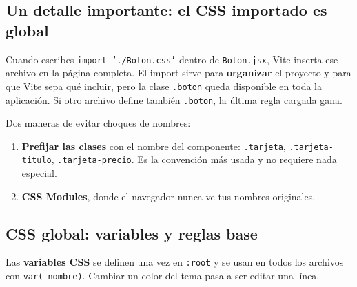 \documentclass[11pt,a4paper]{article}
\newcommand{\cmd}[1]{\texttt{\color{reactdark}#1}}
\begin{document}
\subsection{Un detalle importante: el CSS importado es global}

Cuando escribes \cmd{import './Boton.css'} dentro de \cmd{Boton.jsx}, Vite inserta ese archivo en la página completa. El import sirve para \textbf{organizar} el proyecto y para que Vite sepa qué incluir, pero la clase \cmd{.boton} queda disponible en toda la aplicación. Si otro archivo define también \cmd{.boton}, la última regla cargada gana.

Dos maneras de evitar choques de nombres:
\begin{enumerate}[leftmargin=*]
  \item \textbf{Prefijar las clases} con el nombre del componente: \cmd{.tarjeta}, \cmd{.tarjeta-titulo}, \cmd{.tarjeta-precio}. Es la convención más usada y no requiere nada especial.
  \item \textbf{CSS Modules}, donde el navegador nunca ve tus nombres originales.
\end{enumerate}

\subsection{CSS global: variables y reglas base}

Las \textbf{variables CSS} se definen una vez en \cmd{:root} y se usan en todos los archivos con \cmd{var(--nombre)}. Cambiar un color del tema pasa a ser editar una línea.
\end{document}
